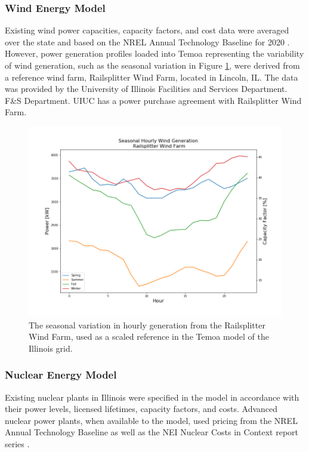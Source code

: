 \subsubsection{Wind Energy Model}
Existing wind power capacities, capacity factors, and cost data were averaged over the state and 
based on the \gls{NREL} Annual Technology Baseline for 2020 
\cite{nrel_2020_2020}. However, power 
generation profiles loaded into Temoa representing the variability of wind 
generation, such as the seasonal variation in Figure 
\ref{fig:seasonal_hourly_wind}, were derived from a reference wind farm, Railsplitter Wind Farm, 
located in Lincoln, IL. The data was provided by the University of Illinois 
Facilities and Services Department.
F\&S Department.  \gls{UIUC} has a power purchase agreement with Railsplitter Wind 
Farm.


\begin{figure}[H]
	\centering
	\includegraphics[width=0.7\columnwidth]{./img/cap/seasonal_hourly_wind.png}
	\caption{The seasonal variation in hourly generation from the Railsplitter Wind Farm, used as a scaled reference in the Temoa model of the Illinois grid. }
	\label{fig:seasonal_hourly_wind}
\end{figure}
\FloatBarrier

\subsubsection{Nuclear Energy Model}
Existing nuclear plants in Illinois were specified in the model in accordance with their 
power levels, licensed lifetimes, capacity factors, and costs. Advanced nuclear power plants, 
when available to the model, used pricing from the \gls{NREL} Annual Technology 
Baseline as well as the \gls{NEI} Nuclear Costs in Context report series
\cite{desai_nuclear_2020,desai_nuclear_2018,nrel_2020_2020}.


